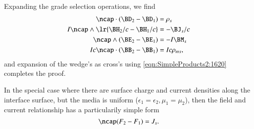 Expanding the grade selection operations, we find
\begin{dmath}\label{eqn:boundarySurfaceSources:440}
\begin{aligned}
\ncap \cdot (\BD_2 - \BD_1) &= \rho_s \\
I \ncap \wedge \lr{ \BH_2/c - \BH_1/c } &= - \BJ_s/c \\
\ncap \wedge (\BE_2 - \BE_1) &= -I \BM_s \\
I c \ncap \cdot (\BB_2 - \BB_1) &= I c \rho_{ms},
\end{aligned}
\end{dmath}
and expansion of the wedge's as cross's using \cref{eqn:SimpleProducts2:1620} completes the proof.

In the special case where there are surface charge and current densities along the interface surface, but the media is uniform (\(\epsilon_1 = \epsilon_2, \mu_1 = \mu_2\)), then the field and current relationship has a particularily simple form \citep{chappell2014geometric}
\begin{dmath}\label{eqn:boundarySurfaceSources:421}
\ncap (F_2 - F_1) = J_s.
\end{dmath}

